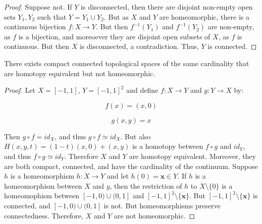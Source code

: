 \documentclass[crop=false,class=book,oneside]{standalone}                      %
\begin{document}
            \begin{proof}
                Suppose not. If $Y$ is disconnected, then there are disjoint
                non-empty open sets $Y_{1},Y_{2}$ such that
                $Y=Y_{1}\cup{Y_{2}}$. But as $X$ and $Y$ are homeomorphic,
                there is a continuous bijection $f:X\rightarrow{Y}$. But then
                $f^{-1}(Y_{1})$ and $f^{-1}(Y_{2})$ are non-empty, as $f$ is a
                bijection, and moreoever they are disjoint open subsets of $X$,
                as $f$ is continuous. But then $X$ is disconnected,
                a contradiction. Thus, $Y$ is connected.
            \end{proof}
            \begin{theorem}
                There exists compact connected topological spaces of the same
                cardinality that are homotopy equivalent but not homeomorphic.
            \end{theorem}
            \begin{proof}
                Let $X=[-1,1]$, $Y=[-1,1]^{2}$ and define
                $f:X\rightarrow{Y}$ and $g:Y\rightarrow{X}$ by:
                \par
                \begin{minipage}[b]{0.49\textwidth}
                    \centering
                    \begin{equation}
                        f(x)=(x,0)
                    \end{equation}
                \end{minipage}
                \hfill
                \begin{minipage}[b]{0.49\textwidth}
                    \centering
                    \begin{equation}
                        g(x,y)=x
                    \end{equation}
                \end{minipage}
                \par\hfill\par
                Then $g\circ{f}=id_{X}$, and thus $g\circ{f}\simeq{id_{X}}$. But
                also $H(x,y,t)=(1-t)(x,0)+(x,y)$ is a homotopy between
                $f\circ{g}$ and $id_{Y}$, and thus $f\circ{g}\simeq{id_{Y}}$.
                Therefore $X$ and $Y$ are homotopy equivalent. Moreover, they
                are both compact, connected, and have the cardinality
                of the continuum. Suppose $h$ is a homeomorphism
                $h:X\rightarrow{Y}$ and let $h(0)=\mathbf{x}\in{Y}$. If $h$ is
                a homeomorphism between $X$ and $y$, then the restriction of $h$
                to $X\setminus\{0\}$ is a homeomophism between $[-1,0)\cup(0,1]$
                and $[-1,1]^{2}\setminus\{\mathbf{x}\}$. But
                $[-1,1]^{2}\setminus\{\mathbf{x}\}$ is connected, and
                $[-1,0)\cup(0,1]$ is not. But homeomorphisms preserve
                connectedness. Therefore, $X$ and $Y$ are not homeomorphic.
            \end{proof}
\end{document}
